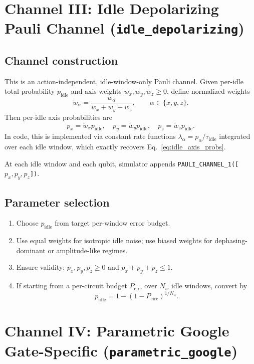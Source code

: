 \documentclass[11pt]{article}
\begin{document}
\section{Channel III: Idle Depolarizing Pauli Channel (\texttt{idle\_depolarizing})}

\subsection{Channel construction}
This is an action-independent, idle-window-only Pauli channel.
Given per-idle total probability $p_{\mathrm{idle}}$ and axis weights
$w_x,w_y,w_z\ge 0$, define normalized weights
\begin{equation}
\tilde w_\alpha = \frac{w_\alpha}{w_x+w_y+w_z},
\qquad \alpha\in\{x,y,z\}.
\end{equation}
Then per-idle axis probabilities are
\begin{equation}
p_x=\tilde w_x p_{\mathrm{idle}},
\quad
p_y=\tilde w_y p_{\mathrm{idle}},
\quad
p_z=\tilde w_z p_{\mathrm{idle}}.
\label{eq:idle_axis_probs}
\end{equation}
In code, this is implemented via constant rate functions
$\lambda_\alpha=p_\alpha/\tau_{\mathrm{idle}}$ integrated over each idle window,
which exactly recovers Eq.~\eqref{eq:idle_axis_probs}.

At each idle window and each qubit, simulator appends
\texttt{PAULI\_CHANNEL\_1([$p_x,p_y,p_z$])}.

\subsection{Parameter selection}
\begin{enumerate}[label=\textbf{I\arabic*}.]
\item Choose $p_{\mathrm{idle}}$ from target per-window error budget.
\item Use equal weights for isotropic idle noise; use biased weights
for dephasing-dominant or amplitude-like regimes.
\item Ensure validity: $p_x,p_y,p_z\ge 0$ and
$p_x+p_y+p_z\le 1$.
\item If starting from a per-circuit budget $P_{\mathrm{circ}}$ over $N_w$ idle windows,
convert by
\begin{equation}
p_{\mathrm{idle}}=1-(1-P_{\mathrm{circ}})^{1/N_w}.
\label{eq:idle_budget_conversion}
\end{equation}
\end{enumerate}

\section{Channel IV: Parametric Google Gate-Specific (\texttt{parametric\_google})}
\end{document}
